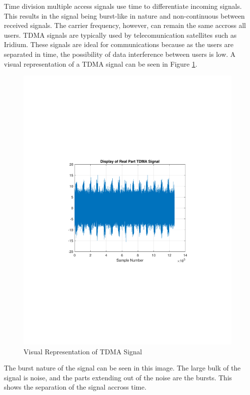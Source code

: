 \documentclass[12pt]{report}
\begin{document}
Time division multiple access signals use time to differentiate incoming signals. This results in the signal being burst-like in nature and non-continuous between received signals. The carrier frequency, however, can remain the same accross all users. TDMA signals are typically used by telecomunication satellites such as Iridium. These signals are ideal for communications because as the users are separated in time, the possibility of data interference between users is low. A visual representation of a TDMA signal can be seen in Figure \ref{fig:TDMAVisual}.

\begin{figure}[h!]
    \centering
    \includegraphics[width=5in]{TDMA_signal}
    \caption{Visual Representation of TDMA Signal}
    \label{fig:TDMAVisual}
\end{figure}

The burst nature of the signal can be seen in this image. The large bulk of the signal is noise, and the parts extending out of the noise are the bursts. This shows the separation of the signal accross time. 
\end{document}

